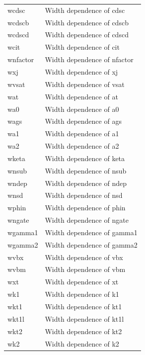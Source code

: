 \begin{longtable}{l l}
{\small wcdsc} & {\small Width dependence of cdsc} \\
{\small wcdscb} & {\small Width dependence of cdscb} \\  
{\small wcdscd} & {\small Width dependence of cdscd} \\  
{\small wcit} & {\small Width dependence of cit} \\
{\small wnfactor} & {\small Width dependence of nfactor} \\
{\small wxj} & {\small Width dependence of xj} \\
{\small wvsat} & {\small Width dependence of vsat} \\
{\small wat} & {\small Width dependence of at} \\
{\small wa0} & {\small Width dependence of a0} \\ 
{\small wags} & {\small Width dependence of ags} \\ 
{\small wa1} & {\small Width dependence of a1} \\
{\small wa2} & {\small Width dependence of a2} \\
{\small wketa} & {\small Width dependence of keta} \\
{\small wnsub} & {\small Width dependence of nsub} \\
{\small wndep} & {\small Width dependence of ndep} \\
{\small wnsd} & {\small Width dependence of nsd} \\
{\small wphin} & {\small Width dependence of phin} \\
{\small wngate} & {\small Width dependence of ngate} \\
{\small wgamma1} & {\small Width dependence of gamma1} \\
{\small wgamma2} & {\small Width dependence of gamma2} \\
{\small wvbx} & {\small Width dependence of vbx} \\
{\small wvbm} & {\small Width dependence of vbm} \\
{\small wxt} & {\small Width dependence of xt} \\
{\small wk1} & {\small Width dependence of k1} \\
{\small wkt1} & {\small Width dependence of kt1} \\
{\small wkt1l} & {\small Width dependence of kt1l} \\
{\small wkt2} & {\small Width dependence of kt2} \\
{\small wk2} & {\small Width dependence of k2} \\

\end{longtable}

